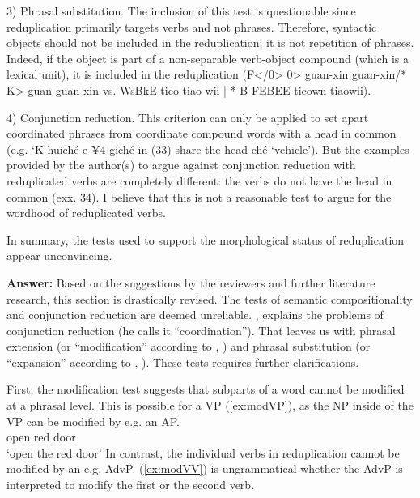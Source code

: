\documentclass[fleqn,twoside]{article}
\begin{document}
\begin{enumerate}
3) Phrasal substitution. The inclusion of this test is questionable since reduplication primarily targets verbs and not phrases. Therefore, syntactic objects should not be included in the reduplication; it is not repetition of phrases. Indeed, if the object is part of a non-separable verb-object compound (which is a lexical unit), it is included in the reduplication (F</0> 0> guan-xin guan-xin/*  K> guan-guan xin vs. WsBkE tico-tiao wii | * B FEBEE ticown tiaowii).

4) Conjunction reduction. This criterion can only be applied to set apart coordinated phrases from coordinate compound words with a head in common (e.g. ‘K huiché e ¥4 giché in (33) share the head  ché ‘vehicle’). But the examples provided by the author(s) to argue against conjunction reduction with reduplicated verbs are completely different: the verbs do not have the head in common (exx. 34). I believe that this is not a reasonable test to argue for the wordhood of reduplicated verbs.

In summary, the tests used to support the morphological status of reduplication appear
unconvincing.


\textbf{Answer:}
Based on the suggestions by the reviewers and further literature research, this section is drastically revised.
The tests of semantic compositionality and conjunction reduction are deemed unreliable.
\citet[37--38]{Dai1992}, \citeyear[120--122]{Dai1998} explains the problems of conjunction reduction (he calls it ``coordination'').
That leaves us with phrasal extension (or ``modification'' according to \citealt[32]{Dai1992}, \citeyear[117]{Dai1998})
and phrasal substitution (or ``expansion'' according to \citealt[33]{Dai1992}, \citeyear[117--120]{Dai1998}).
These tests requires further clarifications.

First, the modification test suggests that subparts of a word cannot be modified at a phrasal level.
This is possible for a VP (\ref{ex:modVP}), as the NP inside of the VP can be modified by e.g. an AP.
\ea\label{ex:modVP} %
\gll {}  \\
open  red door\\
\glt `open the red door'
\z
In contrast, the individual verbs in reduplication cannot be modified by an e.g. AdvP.
(\ref{ex:modVV}) is ungrammatical whether the AdvP is interpreted to modify the first or the second verb.
\z


\end{enumerate}
\end{document}
